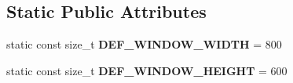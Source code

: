 \subsection*{Static Public Attributes}
\begin{DoxyCompactItemize}
\item 
\hypertarget{class_vixen_1_1_game_window_aaca28a2abf81ceefdc8e9e7ea4228dae}{}static const size\+\_\+t {\bfseries D\+E\+F\+\_\+\+W\+I\+N\+D\+O\+W\+\_\+\+W\+I\+D\+T\+H} = 800\label{class_vixen_1_1_game_window_aaca28a2abf81ceefdc8e9e7ea4228dae}

\item 
\hypertarget{class_vixen_1_1_game_window_ab62355c0520e77c30398bdfd75c496bf}{}static const size\+\_\+t {\bfseries D\+E\+F\+\_\+\+W\+I\+N\+D\+O\+W\+\_\+\+H\+E\+I\+G\+H\+T} = 600\label{class_vixen_1_1_game_window_ab62355c0520e77c30398bdfd75c496bf}

\end{DoxyCompactItemize}
